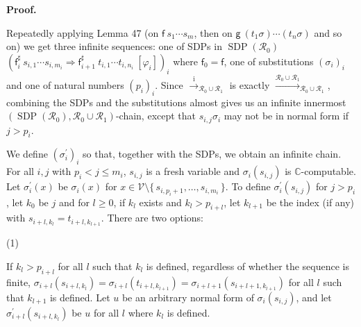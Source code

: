 \documentclass[10pt,a4paper]{amsart}
\begin{document}
 
 
 
 
\par\medskip\noindent\textbf{Proof.}\par
 
 
Repeatedly applying Lemma 47 (on ${\mathsf{f}}\ {{s}_{1}\cdots{s}_{m}}$, then on ${\mathsf{g}}\ {(t_{1}\sigma)\cdots(t_{n}\sigma)}$ and so on) we get three infinite sequences: one of SDPs in $\operatorname{SDP}(\mathcal{R}_{0})$ $({{\mathsf{f}_{i}^{\sharp}}\ {{s}_{i,1}\cdots{s}_{i,m_{i}}}}\Rightarrow{{\mathsf{f}_{i+1}^{\sharp}}\ {{t}_{i,1}\cdots{t}_{i,n_{i}}}}\ [\varphi_{i}])_{i}$ where $\mathsf{f}_{0}=\mathsf{f}$, one of substitutions $(\sigma_{i})_{i}$ and one of natural numbers $(p_{i})_{i}$. Since $\xrightarrow{\scriptscriptstyle\mathrm{i}}_{\mathcal{R}_{0}\cup\mathcal{R}_{1}}$ is exactly $\xrightarrow{\scriptscriptstyle\mathcal{R}_{0}\cup\mathcal{R}_{1}}_{\mathcal{R}_{0}\cup\mathcal{R}_{1}}$, combining the SDPs and the substitutions almost gives us an infinite innermost $(\operatorname{SDP}(\mathcal{R}_{0}),\mathcal{R}_{0}\cup\mathcal{R}_{1})$-chain, except that $s_{i,j}\sigma_{i}$ may not be in normal form if $j>p_{i}$.\par
 
 
 
We define $(\sigma^{\prime}_{i})_{i}$ so that, together with the SDPs, we obtain an infinite chain. For all $i,j$ with $p_{i}<j\leq m_{i}$, $s_{i,j}$ is a fresh variable and $\sigma_{i}(s_{i,j})$ is $\mathbb{C}$-computable. Let $\sigma^{\prime}_{i}(x)$ be $\sigma_{i}(x)$ for $x\in\mathcal{V}\setminus\{\,{s}_{i,p_{i}+1},\ldots,{s}_{i,m_{i}}\,\}$. To define $\sigma^{\prime}_{i}(s_{i,j})$ for $j>p_{i}$, let $k_{0}$ be $j$ and for $l\geq 0$, if $k_{l}$ exists and $k_{l}>p_{i+l}$, let $k_{l+1}$ be the index (if any) with $s_{i+l,k_{l}}=t_{i+l,k_{l+1}}$. There are two options:\par
  
\par\noindent  (1) 
 
If $k_{l}>p_{i+l}$ for all $l$ such that $k_{l}$ is defined, regardless of whether the sequence is finite, $\sigma_{i+l}(s_{i+l,k_{l}})=\sigma_{i+l}(t_{i+l,k_{l+1}})=\sigma_{i+l+1}(s_{i+l+1,k_{l+1}})$ for all $l$ such that $k_{l+1}$ is defined. Let $u$ be an arbitrary normal form of $\sigma_{i}(s_{i,j})$, and let $\sigma^{\prime}_{i+l}(s_{i+l,k_{l}})$ be $u$ for all $l$ where $k_{l}$ is defined.\par
 
\end{document}
